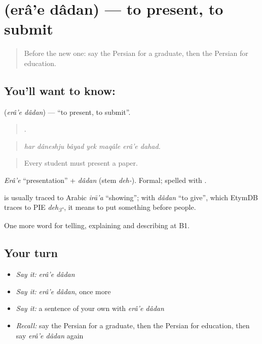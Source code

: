 \section[\texorpdfstring{\fa{ارائه} \fa{دادن} (erâ'e dâdan)}{ارائه دادن (erâ'e dâdan)}]{  (erâ'e dâdan) — to present, to submit}

\label{lesson:FA-C403-erae-dadan}



\begin{quote}
Before the new one: say the Persian for a graduate, then the Persian for education.
\end{quote}

\subsection*{You'll want to know:  }
\textbf{ } (\emph{erâ'e dâdan}) — \textquotedblleft{}to present, to submit\textquotedblright{}.

\begin{quote}
      .
\end{quote}

\begin{quote}
\emph{har dâneshju bâyad yek maqâle erâ'e dahad.}
\end{quote}

\begin{quote}
Every student must present a paper.
\end{quote}

\emph{Erâ'e} \textquotedblleft{}presentation\textquotedblright{} + \emph{dâdan} (stem \emph{deh-}). Formal; spelled with .

\begin{cousinweb}
\textbf{} is usually traced to Arabic \emph{irā'a} \textquotedblleft{}showing\textquotedblright{}; with \emph{dâdan} \textquotedblleft{}to give\textquotedblright{}, which EtymDB traces to PIE \emph{deh\textsubscript{3}-}, it means to put something before people.
\end{cousinweb}

\begin{grammarlens}[title={What you've built}]
One more word for telling, explaining and describing at B1.
\end{grammarlens}

\subsection*{Your turn}
\begin{itemize}
\raggedright
  \item \emph{Say it:} \emph{erâ'e dâdan}
  \item \emph{Say it:} \emph{erâ'e dâdan}, once more
  \item \emph{Say it:} a sentence of your own with \emph{erâ'e dâdan}
  \item \emph{Recall:} say the Persian for a graduate, then the Persian for education, then say \emph{erâ'e dâdan} again
\end{itemize}

